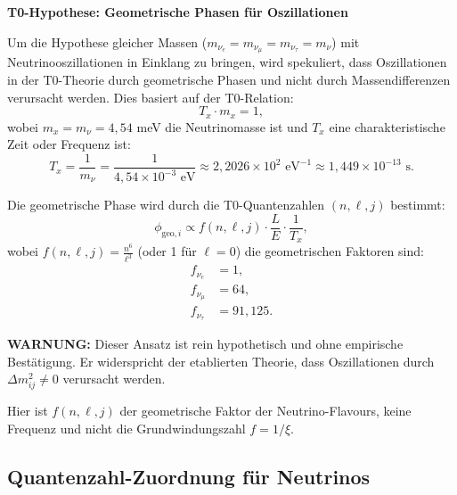 	\begin{speculation}
		\textbf{T0-Hypothese: Geometrische Phasen für Oszillationen}
		
		Um die Hypothese gleicher Massen ($m_{\nu_e} = m_{\nu_\mu} = m_{\nu_\tau} = m_\nu$) mit Neutrinooszillationen in Einklang zu bringen, wird spekuliert, dass Oszillationen in der T0-Theorie durch geometrische Phasen und nicht durch Massendifferenzen verursacht werden. Dies basiert auf der T0-Relation:
		\[
		T_x \cdot m_x = 1,
		\]
		wobei $m_x = m_\nu = 4,54$ meV die Neutrinomasse ist und $T_x$ eine charakteristische Zeit oder Frequenz ist:
		\[
		T_x = \frac{1}{m_\nu} = \frac{1}{4,54 \times 10^{-3} \text{ eV}} \approx 2,2026 \times 10^2 \text{ eV}^{-1} \approx 1,449 \times 10^{-13} \text{ s}.
		\]
		
		Die geometrische Phase wird durch die T0-Quantenzahlen $(n, \ell, j)$ bestimmt:
		\[
		\phi_{\text{geo}, i} \propto f(n, \ell, j) \cdot \frac{L}{E} \cdot \frac{1}{T_x},
		\]
		wobei $f(n, \ell, j) = \frac{n^6}{\ell^3}$ (oder 1 für $\ell = 0$) die geometrischen Faktoren sind:
		\begin{align}
			f_{\nu_e} &= 1, \\
			f_{\nu_\mu} &= 64, \\
			f_{\nu_\tau} &= 91,125.
		\end{align}
		
		\textbf{WARNUNG:} Dieser Ansatz ist rein hypothetisch und ohne empirische Bestätigung. Er widerspricht der etablierten Theorie, dass Oszillationen durch $\Delta m^2_{ij} \neq 0$ verursacht werden.
	\end{speculation}

Hier ist $f(n,\ell,j)$ der geometrische Faktor der Neutrino-Flavours, keine Frequenz und nicht die Grundwindungszahl $f = 1/\xi$.

	\subsection{Quantenzahl-Zuordnung für Neutrinos}
	
	\begin{table}[h]
		\centering
		\caption{Spekulative T0-Quantenzahlen für Neutrino-Flavours}
	\end{table}
	

